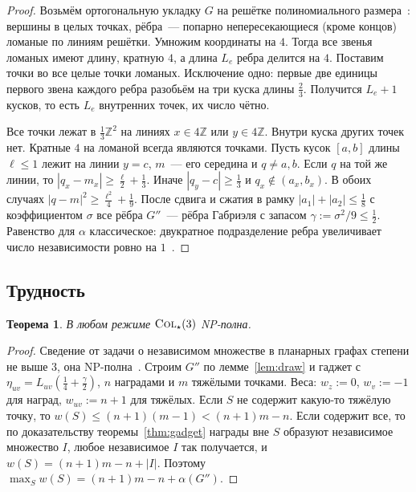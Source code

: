 \documentclass[a4paper,11pt]{article}
\theoremstyle{plain}
\newtheorem{theorem}{Теорема}[section]
\theoremstyle{definition}
\theoremstyle{remark}
\newcommand{\Z}{\mathbb{Z}}
\newcommand{\abs}[1]{\left\lvert #1 \right\rvert}
\newcommand{\COL}{\textsc{Col}}
\begin{document}
\begin{proof}
    Возьмём ортогональную укладку $G$ на решётке полиномиального размера~\cite{Valiant81,Tamassia87}: вершины в целых точках, рёбра~--- попарно непересекающиеся (кроме концов) ломаные по линиям решётки. Умножим координаты на $4$. Тогда все звенья ломаных имеют длину, кратную $4$, а длина $L_e$ ребра делится на $4$. Поставим точки во все целые точки ломаных. Исключение одно: первые две единицы первого звена каждого ребра разобьём на три куска длины $\tfrac23$. Получится $L_e+1$ кусков, то есть $L_e$ внутренних точек, их число чётно.

    Все точки лежат в $\tfrac13\Z^2$ на линиях $x\in4\Z$ или $y\in4\Z$. Внутри куска других точек нет. Кратные $4$ на ломаной всегда являются точками. Пусть кусок $[a,b]$ длины $\ell\le1$ лежит на линии $y=c$, $m$~--- его середина и $q\ne a,b$. Если $q$ на той же линии, то $\abs{q_x-m_x}\ge\tfrac\ell2+\tfrac13$. Иначе $\abs{q_y-c}\ge\tfrac13$ и $q_x\notin(a_x,b_x)$. В обоих случаях $\abs{q-m}^2\ge\tfrac{\ell^2}4+\tfrac19$. После сдвига и сжатия в рамку $\abs{a_1}+\abs{a_2}\le\tfrac18$ с коэффициентом $\sigma$ все рёбра $G''$~--- рёбра Габриэля с запасом $\gamma:=\sigma^2/9\le\tfrac12$. Равенство для $\alpha$ классическое: двукратное подразделение ребра увеличивает число независимости ровно на $1$~\cite{Poljak74}.
\end{proof}

\subsection{Трудность}

\begin{theorem}\label{thm:col}
    В любом режиме $\COL_\star(3)$ NP-полна.
\end{theorem}

\begin{proof}
    Сведение от задачи о независимом множестве в планарных графах степени не выше $3$, она NP-полна~\cite{GareyJohnson77}. Строим $G''$ по лемме~\ref{lem:draw} и гаджет с $\eta_{uv}=L_{uv}(\tfrac14+\tfrac\gamma2)$, $n$ наградами и $m$ тяжёлыми точками. Веса: $w_z:=0$, $w_v:=-1$ для наград, $w_{uv}:=n+1$ для тяжёлых. Если $S$ не содержит какую-то тяжёлую точку, то $w(S)\le(n+1)(m-1)<(n+1)m-n$. Если содержит все, то по доказательству теоремы~\ref{thm:gadget} награды вне $S$ образуют независимое множество $I$, любое независимое $I$ так получается, и $w(S)=(n+1)m-n+\abs I$. Поэтому $\max_Sw(S)=(n+1)m-n+\alpha(G'')$.
\end{proof}
\end{document}
